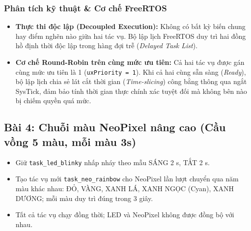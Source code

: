 \subsubsection{Phân tích kỹ thuật \& Cơ chế FreeRTOS}
\begin{itemize}
    \item \textbf{Thực thi độc lập (Decoupled Execution):} Không có bất kỳ biến chung hay điểm nghẽn nào giữa hai tác vụ. Bộ lập lịch FreeRTOS duy trì hai đồng hồ định thời độc lập trong hàng đợi trễ (\textit{Delayed Task List}).
    \item \textbf{Cơ chế Round-Robin trên cùng mức ưu tiên:} Cả hai tác vụ được gán cùng mức ưu tiên là 1 (\texttt{uxPriority = 1}). Khi cả hai cùng sẵn sàng (\textit{Ready}), bộ lập lịch chia sẻ lát cắt thời gian (\textit{Time-slicing}) công bằng thông qua ngắt SysTick, đảm bảo tính thời gian thực chính xác tuyệt đối mà không bên nào bị chiếm quyền quá mức.
\end{itemize}

\newpage
\subsection{Bài 4: Chuỗi màu NeoPixel nâng cao (Cầu vồng 5 màu, mỗi màu 3s)}

\begin{tcolorbox}[
    enhanced, colback=black!2, colframe=black!60, boxrule=1pt, arc=2.5mm, drop shadow,
    attach boxed title to top left={xshift=4mm, yshift=-3mm},
    boxed title style={enhanced, colback=black!85, colframe=black!85, boxrule=1pt, arc=2.5mm, drop shadow, left=6pt, right=6pt, top=2pt, bottom=2pt},
    title=\textcolor{white}{\large\textbf{Yêu cầu đề bài (Trích phiếu bài tập)}}
]
\bfseries
\vspace{0.2cm}
\begin{itemize}
    \item Giữ \texttt{task\_led\_blinky} nhấp nháy theo mẫu SÁNG 2 s, TẮT 2 s.
    \item Tạo tác vụ mới \texttt{task\_neo\_rainbow} cho NeoPixel lần lượt chuyển qua năm màu khác nhau: ĐỎ, VÀNG, XANH LÁ, XANH NGỌC (Cyan), XANH DƯƠNG; mỗi màu duy trì đúng trong 3 giây.
    \item Tất cả tác vụ chạy đồng thời; LED và NeoPixel không được đồng bộ với nhau.
\end{itemize}
\end{tcolorbox}

